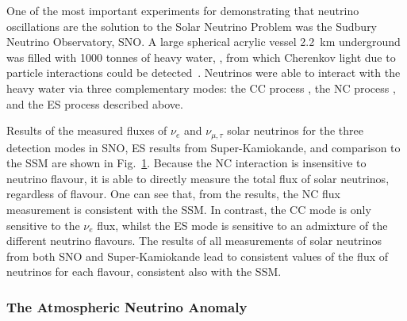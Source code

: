 One of the most important experiments for demonstrating that neutrino oscillations are the solution to the Solar Neutrino Problem was the Sudbury Neutrino Observatory, SNO. A large spherical acrylic vessel \SI{2.2}{\km} underground was filled with \num{1000} tonnes of heavy water, , from which Cherenkov light due to particle interactions could be detected~\cite{BOGER2000172}. Neutrinos were able to interact with the heavy water via three complementary modes: the CC process , the NC process , and the ES process described above.

Results of the measured fluxes of $\nu_{e}$ and $\nu_{\mu,\tau}$ solar neutrinos for the three detection modes in SNO, ES results from Super-Kamiokande, and comparison to the SSM are shown in Fig.~\ref{fig:sno_flux_results}. Because the NC interaction is insensitive to neutrino flavour, it is able to directly measure the total flux of \beight{} solar neutrinos, regardless of flavour. One can see that, from the results, the NC flux measurement is consistent with the SSM. In contrast, the CC mode is only sensitive to the $\nu_{e}$ flux, whilst the ES mode is sensitive to an admixture of the different neutrino flavours. The results of all measurements of solar neutrinos from both SNO and Super-Kamiokande lead to consistent values of the flux of \beight{} neutrinos for each flavour, consistent also with the SSM.

\begin{figure}
    \centering
    \caption[]{}
    \label{fig:sno_flux_results}
\end{figure}


\subsubsection{The Atmospheric Neutrino Anomaly}


